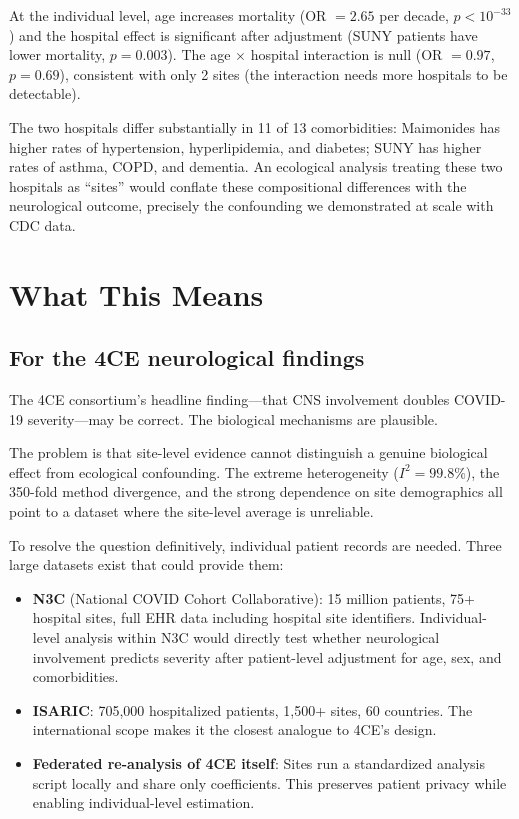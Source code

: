 \documentclass{article}
\begin{document}
At the individual level, age increases mortality (OR $= 2.65$ per decade,
$p < 10^{-33}$) and the hospital effect is significant after adjustment
(SUNY patients have lower mortality, $p = 0.003$).  The age $\times$ hospital
interaction is null (OR $= 0.97$, $p = 0.69$), consistent with only 2
sites (the interaction needs more hospitals to be detectable).

The two hospitals differ substantially in 11 of 13 comorbidities: Maimonides
has higher rates of hypertension, hyperlipidemia, and diabetes; SUNY has
higher rates of asthma, COPD, and dementia.  An ecological analysis treating
these two hospitals as ``sites'' would conflate these compositional differences
with the neurological outcome, precisely the confounding we demonstrated at
scale with CDC data.


\section{What This Means}

\subsection{For the 4CE neurological findings}

The 4CE consortium's headline finding---that CNS involvement doubles
COVID-19 severity---may be correct.  The biological mechanisms are plausible.

The problem is that site-level evidence cannot distinguish a genuine
biological effect from ecological confounding.  The extreme heterogeneity
($I^2 = 99.8\%$), the 350-fold method divergence, and the strong dependence
on site demographics all point to a dataset where the site-level average is
unreliable.

To resolve the question definitively, individual patient records are needed.
Three large datasets exist that could provide them:

\begin{itemize}
\item \textbf{N3C} (National COVID Cohort Collaborative): 15 million patients,
75+ hospital sites, full EHR data including hospital site identifiers.
Individual-level analysis within N3C would directly test whether neurological
involvement predicts severity after patient-level adjustment for age, sex,
and comorbidities.

\item \textbf{ISARIC}: 705,000 hospitalized patients, 1,500+ sites, 60
countries.  The international scope makes it the closest analogue to 4CE's
design.

\item \textbf{Federated re-analysis of 4CE itself}: Sites run a standardized
analysis script locally and share only coefficients.  This preserves patient
privacy while enabling individual-level estimation.
\end{itemize}
\end{document}
